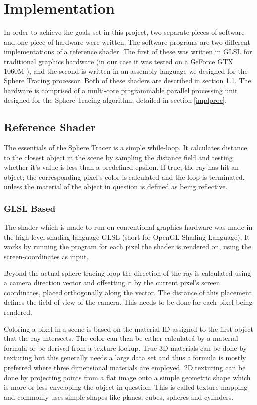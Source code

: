 \chapter{Implementation}

	In order to achieve the goals set in this project, two separate pieces of 
	software and one piece of hardware were written. The software programs are 
	two different implementations of a reference shader. The first of these was 
	written in GLSL for traditional graphics hardware (in our case it was 
	tested on a GeForce GTX 1060M ), and the second is written in an assembly 
	language we designed for the Sphere Tracing processor. Both of these 
	shaders are described in section \ref{implshader}. The hardware is 
	comprised of a multi-core programmable parallel processing unit designed 
	for the Sphere Tracing algorithm, detailed in section \ref{implproc}.

	\section{Reference Shader} \label{implshader}

		The essentials of the Sphere Tracer is a simple while-loop. It
		calculates distance to the closest object in the scene by sampling
		the distance field and testing whether it's value is less than a
		predefined epsilon. If true, the ray has hit an object; the
		corresponding pixel's color is calculated and the loop is
		terminated, unless the material of the object in question is
		defined as being reflective.

		\subsection{GLSL Based}

			The shader which is made to run on conventional graphics hardware
			was made in the high-level shading language GLSL (short for OpenGL
			Shading Language). It works by running the program for each pixel
			the shader is rendered on, using the screen-coordinates as input.

			Beyond the actual sphere tracing loop the direction of the ray is
			calculated using a camera direction vector and offsetting it by the current 
			pixel's screen coordinates, placed orthogonally along the vector.
			The distance of this placement defines the field of view of the 
			camera. This needs to be done for each pixel being rendered.

			Coloring a pixel in a scene is based on the material ID
			assigned to the first object that the ray intersects. The color
			can then be either calculated by a material formula or be 
			derived from a texture lookup. True 3D materials can be done by
			texturing but this generally needs a large data set and thus a 
			formula is mostly preferred where three dimensional materials 
			are employed. 2D texturing can be done by projecting points from
			a flat image onto a simple geometric shape  which is more or less 
			enveloping the object in question. This is called texture-mapping 
			and commonly uses simple shapes like planes, cubes, spheres and 
			cylinders. 

